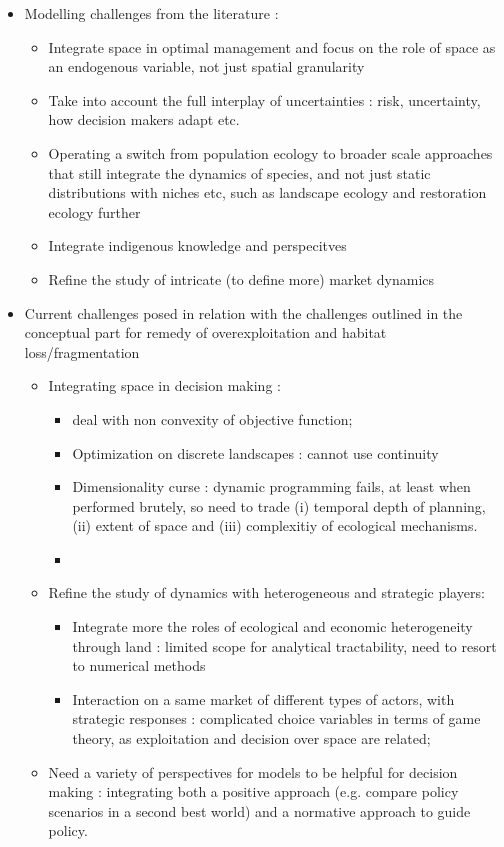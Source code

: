 \begin{itemize}
\item Modelling challenges from the literature : 
\begin{itemize}
\item Integrate space in optimal management and focus on the role of space as an endogenous variable, not just spatial granularity
\item Take into account the full interplay of uncertainties : risk, uncertainty, how decision makers adapt etc. 
\item Operating a switch from population ecology to broader scale approaches that still integrate the dynamics of species, and not just static distributions with niches etc, such as landscape ecology and restoration ecology further
\item Integrate indigenous knowledge and perspecitves
\item Refine the study of intricate (to define more) market dynamics
\end{itemize}
\item Current challenges posed in relation with the challenges outlined in the conceptual part for remedy of overexploitation and habitat loss/fragmentation
\begin{itemize}
\item Integrating space in decision making : 
\begin{itemize}
\item deal with non convexity of objective function; 
\item Optimization on discrete landscapes : cannot use continuity
\item Dimensionality curse : dynamic programming fails, at least when performed brutely, so need to trade (i) temporal depth of planning, (ii) extent of space and (iii) complexitiy of ecological mechanisms. 
\item 
\end{itemize}
\item Refine the study of dynamics with heterogeneous and strategic players:
\begin{itemize}
\item Integrate more the roles of ecological and economic heterogeneity through land : limited scope for analytical tractability, need to resort to numerical methods
\item Interaction on a same market of different types of actors, with strategic responses : complicated choice variables in terms of game theory, as exploitation and decision over space are related; 
\end{itemize}
\item Need a variety of perspectives for models to be helpful for decision making : integrating both a positive approach (e.g. compare policy scenarios in a second best world) and a normative approach to guide policy. 
\end{itemize}
\end{itemize}


